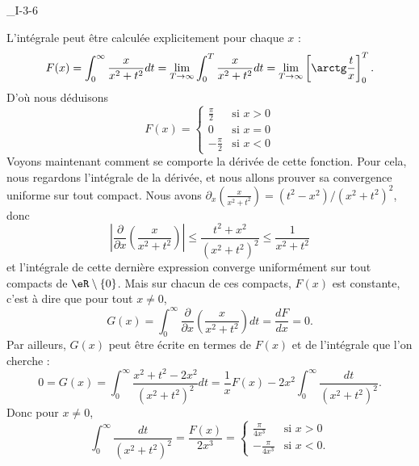 

\begin{corrige}{_I-3-6}

L'intégrale peut être calculée explicitement pour chaque $x$ :
\begin{equation}
	F(x)=\int_0^{\infty}\frac{ x }{ x^2+t^2 }dt=\lim_{T\to\infty}\int_0^{T}\frac{ x }{ x^2+t^2 }dt=\lim_{T\to\infty}\left[ \arctg\frac{ t }{ x } \right]_0^T.
\end{equation}
D'où nous déduisons
\begin{equation}
	F(x)=\begin{cases}
	\frac{ \pi }{ 2 }	&	\text{si $x>0$}\\
	0			&	\text{si $x=0$}\\
	-\frac{ \pi }{2}	&	\text{si $x<0$}
\end{cases}
\end{equation}
Voyons maintenant comment se comporte la dérivée de cette fonction. Pour cela, nous regardons l'intégrale de la dérivée, et nous allons prouver sa convergence uniforme sur tout compact. Nous avons $\partial_x\left(\frac{ x }{ x^2+t^2 }\right)=(t^2-x^2)/(x^2+t^2)^2$, donc
\begin{equation}
	\left| \frac{ \partial  }{ \partial x }\left(\frac{ x }{ x^2+t^2 }\right) \right| \leq \frac{ t^2+x^2 }{ (x^2+t^2)^2 }\leq \frac{1}{ x^2+t^2 }
\end{equation}
et l'intégrale de cette dernière expression converge uniformément sur tout compacts de $\eR\setminus\{ 0 \}$. Mais sur chacun de ces compacts, $F(x)$ est constante, c'est à dire que pour tout $x\neq 0$,
\begin{equation}
	G(x)=\int_0^{\infty}\frac{ \partial  }{ \partial x }\left( \frac{ x }{ x^2+t^2 } \right)dt=\frac{ dF }{ dx }=0.
\end{equation}
Par ailleurs, $G(x)$ peut être écrite en termes de $F(x)$ et de l'intégrale que l'on cherche :
\begin{equation}
	0=G(x)=\int_0^{\infty}\frac{ x^2+t^2-2x^2 }{ (x^2+t^2)^2 }dt=\frac{1}{ x }F(x)-2x^2\int_0^{\infty}\frac{ dt }{ (x^2+t^2)^2 }.
\end{equation}
Donc pour $x\neq 0$,
\begin{equation}
	\int_0^{\infty}\frac{ dt }{ (x^2+t^2)^2 }=\frac{ F(x) }{ 2x^3 }=\begin{cases}
	\frac{ \pi }{ 4x^3 }	&	\text{si $x>0$}\\
	-\frac{ \pi }{ 4x^3 }	&	 \text{si $x<0$}.
\end{cases}
\end{equation}

\end{corrige}
